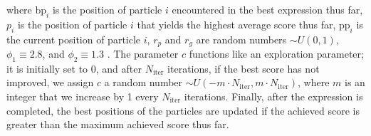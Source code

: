 \documentclass[12pt]{iopart}
\begin{document}
where $\mathrm{bp}_i$ is the position of particle $i$ encountered in the best expression thus far, $p_i$ is the position of particle $i$ that yields the highest average score thus far, $\mathrm{pp}_i$ is the current position of particle $i$, $r_p$ and $r_g$ are random numbers $\sim U(0,1)$, $\phi_1 \equiv 2.8$, and $\phi_2 \equiv 1.3$  \cite{offShellPSO}. The parameter $c$ functions like an exploration parameter; it is initially set to 0, and after $N_{\mathrm{iter}}$ iterations, if the best score has not improved, we assign $c$ a random number $\sim U(-m\cdot N_{\mathrm{iter}}, m\cdot N_{\mathrm{iter}})$, where $m$ is an integer that we increase by 1 every $N_{\mathrm{iter}}$ iterations. Finally, after the expression is completed, the best positions of the particles are updated if the achieved score is greater than the maximum achieved score thus far.
\end{document}
